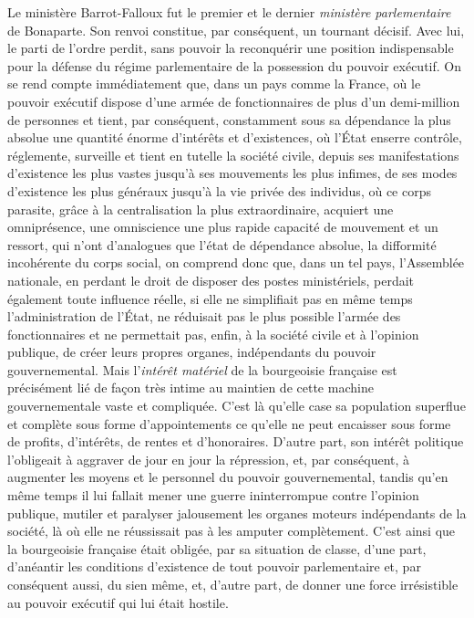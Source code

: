 \documentclass[french,twoside]{book} %
\begin{document}
Le ministère Barrot-Falloux fut le premier et le dernier \emph{ministère parlementaire} de Bonaparte. Son renvoi constitue, par conséquent, un tournant décisif. Avec lui, le parti de l’ordre perdit, sans pouvoir la reconquérir une position indispensable pour la défense du régime parlementaire de la possession du pouvoir exécutif. On se rend compte immédiatement que, dans un pays comme la France, où le pouvoir exécutif dispose d’une armée de fonctionnaires de plus d’un demi-million de personnes et tient, par conséquent, constamment sous sa dépendance la plus absolue une quantité énorme d’intérêts et d’existences, où l’État enserre contrôle, réglemente, surveille et tient en tutelle la société civile, depuis ses manifestations d’existence les plus vastes jusqu’à ses mouvements les plus infimes, de ses modes d’existence les plus généraux jusqu’à la vie privée des individus, où ce corps parasite, grâce à la centralisation la plus extraordinaire, acquiert une omniprésence, une omniscience une plus rapide capacité de mouvement et un ressort, qui n’ont d’analogues que l’état de dépendance absolue, la difformité incohérente du corps social, on comprend donc que, dans un tel pays, l’Assemblée nationale, en perdant le droit de disposer des postes ministériels, perdait également toute influence réelle, si elle ne simplifiait pas en même temps l’administration de l’État, ne réduisait pas le plus possible l’armée des fonctionnaires et ne permettait pas, enfin, à la société civile et à l’opinion publique, de créer leurs propres organes, indépendants du pouvoir gouvernemental. Mais l’\emph{intérêt matériel} de la bourgeoisie française est précisément lié de façon très intime au maintien de cette machine gouvernementale vaste et compliquée. C’est là qu’elle case sa population superflue et complète sous forme d’appointements ce qu’elle ne peut encaisser sous forme de profits, d’intérêts, de rentes et d’honoraires. D’autre part, son intérêt politique l’obligeait à aggraver de jour en jour la répression, et, par conséquent, à augmenter les moyens et le personnel du pouvoir gouvernemental, tandis qu’en même temps il lui fallait mener une guerre ininterrompue contre l’opinion publique, mutiler et paralyser jalousement les organes moteurs indépendants de la société, là où elle ne réussissait pas à les amputer complètement. C’est ainsi que la bourgeoisie française était obligée, par sa situation de classe, d’une part, d’anéantir les conditions d’existence de tout pouvoir parlementaire et, par conséquent aussi, du sien même, et, d’autre part, de donner une force irrésistible au pouvoir exécutif qui lui était hostile.\par
\end{document}
